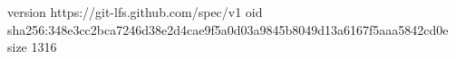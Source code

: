 version https://git-lfs.github.com/spec/v1
oid sha256:348e3cc2bca7246d38e2d4cae9f5a0d03a9845b8049d13a6167f5aaa5842cd0e
size 1316
